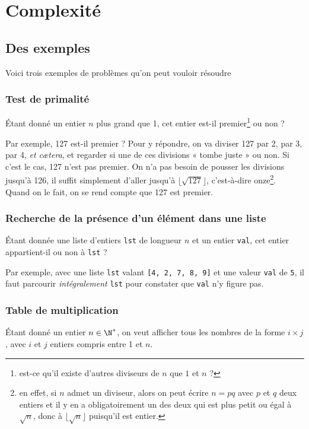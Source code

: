\chapter{Complexité}
\section{Des exemples}

Voici trois exemples de problèmes qu'on peut vouloir résoudre 

\subsection{Test de primalité}
    Étant donné un entier $n$ plus grand que 1, cet entier est-il premier\footnote{\noindent est-ce qu'il existe d'autres diviseurs de $n$ que $1$ et $n$ ?} ou non ?\medskip

    Par exemple, 127 est-il premier ? Pour y répondre, on va diviser 127 par 2, par 3, par 4, \textit{et cætera}, et regarder si une de ces divisions « tombe juste » ou non. Si c'est le cas, 127 n'est pas premier. On n'a pas besoin de pousser les divisions jusqu'à 126, il suffit simplement d'aller jusqu'à $\lfloor\sqrt{127}\rfloor$, c'est-à-dire onze\footnote{\noindent en effet, si $n$ admet un diviseur, alors on peut écrire $n=pq$ avec $p$ et $q$ deux entiers et il y en a obligatoirement un des deux qui est plus petit ou égal à $\sqrt{n}$, donc à $\lfloor\sqrt{n}\rfloor$ puisqu'il est entier.}.\\
    Quand on le fait, on se rend compte que 127 est premier.

\subsection{Recherche de la présence d'un élément dans une liste}
    Étant donnée une liste d'entiers \texttt{lst} de longueur $n$ et un entier \texttt{val}, cet entier appartient-il ou non à \texttt{lst} ?\medskip

    Par exemple, avec une liste \texttt{lst} valant \texttt{[4, 2, 7, 8, 9]} et une valeur \texttt{val} de \texttt{5}, il faut parcourir \textit{intégralement} \texttt{lst} pour constater que \texttt{val} n'y figure pas.

\subsection{Table de multiplication}
    Étant donné un entier $n\in\N^*$, on veut afficher tous les nombres de la forme $i\times j$, avec $i$ et $j$ entiers compris entre 1 et $n$.\medskip

